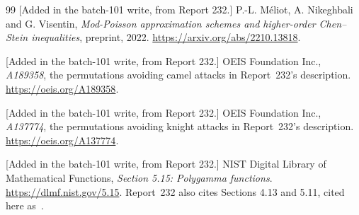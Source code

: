 \documentclass[11pt]{article}
\numberwithin{equation}{section}
\theoremstyle{definition}
\theoremstyle{remark}
\theoremstyle{definition}
\begin{document}
\begin{thebibliography}{99}
[Added in the batch-101 write, from Report 232.] P.-L. M\'eliot,
A. Nikeghbali and G. Visentin, \emph{Mod-Poisson approximation schemes and
higher-order Chen--Stein inequalities}, preprint, 2022.
\url{https://arxiv.org/abs/2210.13818}.

[Added in the batch-101 write, from Report 232.] OEIS Foundation Inc.,
\emph{A189358}, the permutations avoiding camel attacks in Report~232's
description.
\url{https://oeis.org/A189358}.

[Added in the batch-101 write, from Report 232.] OEIS Foundation Inc.,
\emph{A137774}, the permutations avoiding knight attacks in Report~232's
description.
\url{https://oeis.org/A137774}.

[Added in the batch-101 write, from Report 232.] NIST Digital Library of
Mathematical Functions, \emph{Section 5.15: Polygamma functions}.
\url{https://dlmf.nist.gov/5.15}. Report~232 also cites Sections 4.13 and
5.11, cited here as~\cite{dlmfW,dlmfGamma}.
\end{thebibliography}
\end{document}
